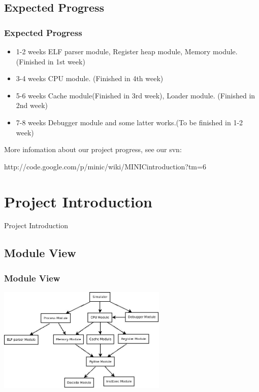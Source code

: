 \documentclass[CJK]{beamer}
\begin{document}
\begin{CJK}{UTF8}{gbsn}
\subsection{Expected Progress}
\begin{frame}
  \frametitle{Expected Progress}
  \begin{itemize}
    \item
      {\color{blue}1-2 weeks} ELF parser module, Register heap module, Memory module. {\color{red}(Finished in 1st week)}
    \item
      {\color{blue}3-4 weeks} CPU module. {\color{red}(Finished in 4th week)}
    \item
      {\color{blue}5-6 weeks} Cache module{\color{red}(Finished in 3rd week)}, Loader module. {\color{red}(Finished in 2nd week)}
    \item
      {\color{blue}7-8 weeks} Debugger module and some latter works.{\color{red}(To be finished in 1-2 week)}
  \end{itemize}
  More infomation about our project progress, see our svn:

  {\color{blue}http://code.google.com/p/minic/wiki/MINICintroduction?tm=6}
\end{frame}

\section{Project Introduction}

\begin{frame}
  \huge{Project Introduction}
\end{frame}

\subsection{Module View}
\begin{frame}
  \frametitle{Module View}
  \includegraphics[height=5cm]{module_view.jpeg}
\end{frame}


\end{CJK}
\end{document}
